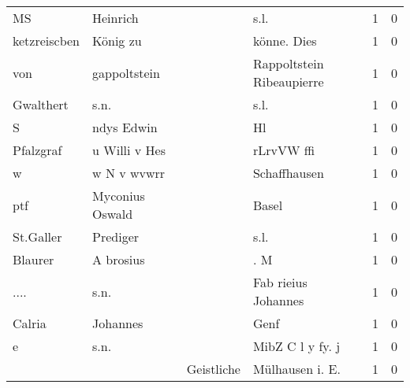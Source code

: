 \documentclass[10pt,a4paper,landscape]{article}
\begin{document}
\begin{longtable}{llllrr}
                       MS &                           Heinrich &             &                                        s.l. &          1 &         0 \\
             ketzreiscben &                           König zu &             &                                 könne. Dies &          1 &         0 \\
                      von &                       gappoltstein &             &                   Rappoltstein Ribeaupierre &          1 &         0 \\
                Gwalthert &                               s.n. &             &                                        s.l. &          1 &         0 \\
                        S &                         ndys Edwin &             &                                          Hl &          1 &         0 \\
                Pfalzgraf &                      u Willi v Hes &             &                                  rLrvVW ffi &          1 &         0 \\
                        w &                        w N v wvwrr &             &                                Schaffhausen &          1 &         0 \\
                      ptf &                    Myconius Oswald &             &                                       Basel &          1 &         0 \\
                St.Galler &                           Prediger &             &                                        s.l. &          1 &         0 \\
                  Blaurer &                          A brosius &             &                                         . M &          1 &         0 \\
                     .... &                               s.n. &             &                         Fab rieius Johannes &          1 &         0 \\
                   Calria &                           Johannes &             &                                        Genf &          1 &         0 \\
                        e &                               s.n. &             &                            MibZ C l y fy. j &          1 &         0 \\
                          &                                    &  Geistliche &                            Mülhausen i. E.  &          1 &         0 \\

\end{longtable}
\end{document}
